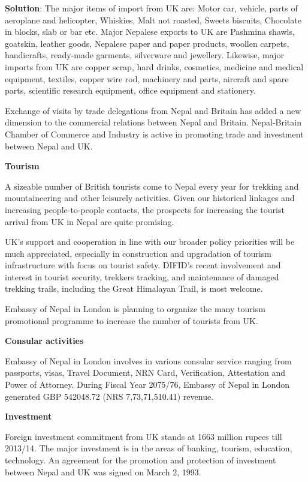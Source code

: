 \documentclass[
  openany]{book}
\newenvironment{solution}{ {\bfseries Solution}:}{}
\begin{document}
\begin{questions}
\begin{solution}
The major items of import from UK are: Motor car, vehicle, parts of aeroplane and helicopter, Whiskies, Malt not roasted, Sweets biscuits, Chocolate in blocks, slab or bar etc. Major Nepalese exports to UK are Pashmina shawls, goatskin, leather goods, Nepalese paper and paper products, woollen carpets, handicrafts, ready-made garments, silverware and jewellery. Likewise, major imports from UK are copper scrap, hard drinks, cosmetics, medicine and medical equipment, textiles, copper wire rod, machinery and parts, aircraft and spare parts, scientific research equipment, office equipment and stationery.

Exchange of visits by trade delegations from Nepal and Britain has added a new dimension to the commercial relations between Nepal and Britain. Nepal-Britain Chamber of Commerce and Industry is active in promoting trade and investment between Nepal and UK.

\textbf{Tourism}

A sizeable number of British tourists come to Nepal every year for trekking and mountaineering and other leisurely activities. Given our historical linkages and increasing people-to-people contacts, the prospects for increasing the tourist arrival from UK in Nepal are quite promising.

UK's support and cooperation in line with our broader policy priorities will be much appreciated, especially in construction and upgradation of tourism infrastructure with focus on tourist safety. DIFID’s recent involvement and interest in tourist security, trekkers tracking, and maintenance of damaged trekking trails, including the Great Himalayan Trail, is most welcome.

Embassy of Nepal in London is planning to organize the many tourism promotional programme to increase the number of tourists from UK.

\textbf{Consular activities}

Embassy of Nepal in London involves in various consular service ranging from passports, visas, Travel Document, NRN Card, Verification, Attestation and Power of Attorney. During Fiscal Year 2075/76, Embassy of Nepal in London generated GBP 542048.72 (NRS 7,73,71,510.41) revenue.

\textbf{Investment}

Foreign investment commitment from UK stands at 1663 million rupees till 2013/14. The major investment is in the areas of banking, tourism, education, technology. An agreement for the promotion and protection of investment between Nepal and UK was signed on March 2, 1993.


\end{solution}
\end{questions}
\end{document}

